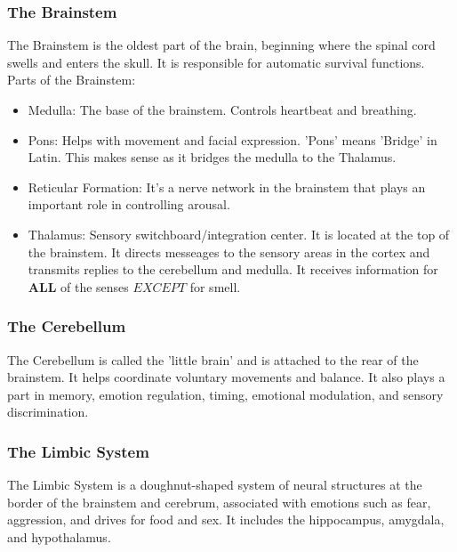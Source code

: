\subsubsection{The Brainstem}
The Brainstem is the oldest part of the brain, beginning where the spinal cord swells and enters the skull. It is responsible for automatic survival functions.
\\Parts of the Brainstem:
\begin{itemize}
    \item Medulla: The base of the brainstem. Controls heartbeat and breathing.
    \item Pons: Helps with movement and facial expression. 'Pons' means 'Bridge' in Latin. This makes sense as it bridges the medulla to the Thalamus. 
    \item Reticular Formation: It's a nerve network in the brainstem that plays an important role in controlling arousal.
    \item Thalamus: Sensory switchboard/integration center. It is located at the top of the brainstem. It directs messeages to the sensory areas in the cortex and transmits replies to the cerebellum and medulla. It receives information for $\mathbf{ALL}$ of the senses $\mathbf{}{EXCEPT}$ for smell.
\end{itemize}

\subsubsection{The Cerebellum}
The Cerebellum is called the 'little brain' and is attached to the rear of the brainstem. It helps coordinate voluntary movements and balance. It also plays a part in memory, emotion regulation, timing, emotional modulation, and sensory discrimination.

\subsubsection{The Limbic System}
The Limbic System is a doughnut-shaped system of neural structures at the border of the brainstem and cerebrum, associated with emotions such as fear, aggression, and drives for food and sex. It includes the hippocampus, amygdala, and hypothalamus.

